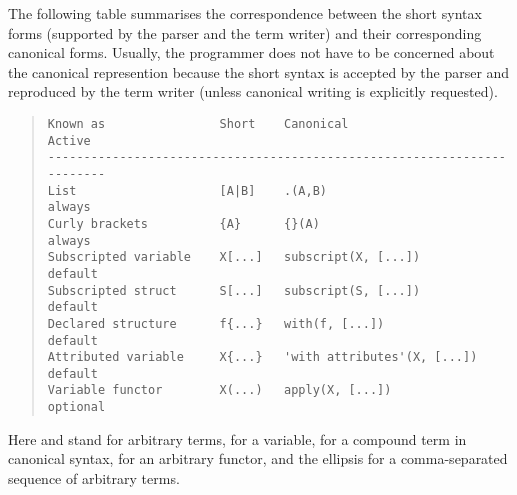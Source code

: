 The following table summarises the correspondence between the short syntax
forms (supported by the parser and the term writer) and their corresponding
canonical forms. Usually, the programmer does not have to be concerned about
the canonical represention because the short syntax is accepted by the parser
and reproduced by the term writer (unless canonical writing is explicitly
requested).
\begin{quote}
\begin{verbatim}
Known as                Short    Canonical                    Active
------------------------------------------------------------------------
List                    [A|B]    .(A,B)                       always
Curly brackets          {A}      {}(A)                        always
Subscripted variable    X[...]   subscript(X, [...])          default
Subscripted struct      S[...]   subscript(S, [...])          default
Declared structure      f{...}   with(f, [...])               default
Attributed variable     X{...}   'with attributes'(X, [...])  default
Variable functor        X(...)   apply(X, [...])              optional
\end{verbatim}
\end{quote}
Here  and  stand for arbitrary terms,  for a
variable,  for a compound term in canonical syntax,  for
an arbitrary functor, and the ellipsis for a comma-separated sequence of
arbitrary terms.

